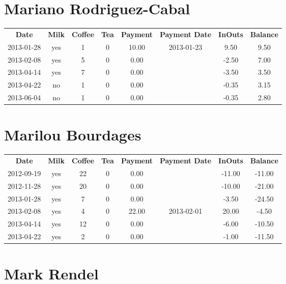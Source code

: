 \section{Mariano Rodriguez-Cabal}

\begin{center}
\begin{tabular}{cccccccc}
\textbf{Date} & \textbf{Milk} & \textbf{Coffee} & \textbf{Tea} & \textbf{Payment} & \textbf{Payment Date} & \textbf{InOuts} & \textbf{Balance} \\
2013-01-28 & yes & 1 & 0 & 10.00 & 2013-01-23 &  9.50 & 9.50\\ 
2013-02-08 & yes & 5 & 0 &  0.00 &  & -2.50 & 7.00\\ 
2013-04-14 & yes & 7 & 0 &  0.00 &  & -3.50 & 3.50\\ 
2013-04-22 & no & 1 & 0 &  0.00 &  & -0.35 & 3.15\\ 
2013-06-04 & no & 1 & 0 &  0.00 &  & -0.35 & 2.80
\end{tabular}
\end{center}

\section{Marilou Bourdages}

\begin{center}
\begin{tabular}{cccccccc}
\textbf{Date} & \textbf{Milk} & \textbf{Coffee} & \textbf{Tea} & \textbf{Payment} & \textbf{Payment Date} & \textbf{InOuts} & \textbf{Balance} \\
2012-09-19 & yes & 22 & 0 &  0.00 &  & -11.00 & -11.00\\ 
2012-11-28 & yes & 20 & 0 &  0.00 &  & -10.00 & -21.00\\ 
2013-01-28 & yes &  7 & 0 &  0.00 &  &  -3.50 & -24.50\\ 
2013-02-08 & yes &  4 & 0 & 22.00 & 2013-02-01 &  20.00 &  -4.50\\ 
2013-04-14 & yes & 12 & 0 &  0.00 &  &  -6.00 & -10.50\\ 
2013-04-22 & yes &  2 & 0 &  0.00 &  &  -1.00 & -11.50
\end{tabular}
\end{center}

\section{Mark Rendel}

